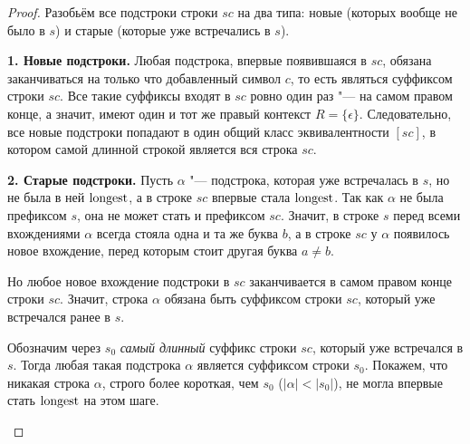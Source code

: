 \begin{proof}
    Разобьём все подстроки строки $sc$ на два типа: новые (которых вообще не было в $s$) и старые (которые уже встречались в $s$).

    \textbf{1. Новые подстроки.} Любая подстрока, впервые появившаяся в $sc$, обязана заканчиваться на только что добавленный символ $c$, то есть являться суффиксом строки $sc$. Все такие суффиксы входят в $sc$ ровно один раз "--- на самом правом конце, а значит, имеют один и тот же правый контекст $R = \{\epsilon\}$. Следовательно, все новые подстроки попадают в один общий класс эквивалентности $[sc]$, в котором самой длинной строкой является вся строка $sc$.

    \textbf{2. Старые подстроки.} Пусть $\alpha$ "--- подстрока, которая уже встречалась в $s$, но не была в ней $\operatorname{longest}$, а в строке $sc$ впервые стала $\operatorname{longest}$. Так как $\alpha$ не была префиксом $s$, она не может стать и префиксом $sc$. Значит, в строке $s$ перед всеми вхождениями $\alpha$ всегда стояла одна и та же буква $b$, а в строке $sc$ у $\alpha$ появилось новое вхождение, перед которым стоит другая буква $a \ne b$.

    Но любое новое вхождение подстроки в $sc$ заканчивается в самом правом конце строки $sc$. Значит, строка $\alpha$ обязана быть суффиксом строки $sc$, который уже встречался ранее в $s$.

    Обозначим через $s_0$ \emph{самый длинный} суффикс строки $sc$, который уже встречался в $s$. Тогда любая такая подстрока $\alpha$ является суффиксом строки $s_0$. Покажем, что никакая строка $\alpha$, строго более короткая, чем $s_0$ ($|\alpha| < |s_0|$), не могла впервые стать $\operatorname{longest}$ на этом шаге.

    \begin{center}
    \end{center}


\end{proof}
